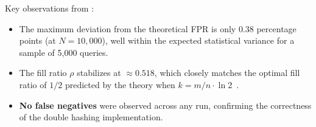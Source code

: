 Key observations from :
\begin{itemize}[nosep]
    \item The maximum deviation from the theoretical FPR is only $0.38$ percentage points (at $N = 10{,}000$), well within the expected statistical variance for a sample of 5{,}000 queries.
    \item The fill ratio $\rho$ stabilizes at $\approx 0.518$, which closely matches the optimal fill ratio of $1/2$ predicted by the theory when $k = m/n \cdot \ln 2$~\citep{mitzenmacher2017}.
    \item \textbf{No false negatives} were observed across any run, confirming the correctness of the double hashing implementation.
\end{itemize}



